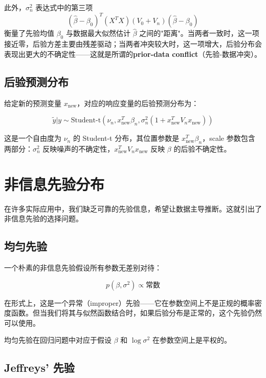 此外，$\sigma_n^2$ 表达式中的第三项
\[
(\hat{\beta} - \beta_0)^T(X^TX)(V_0 + V_n)(\hat{\beta} - \beta_0)
\]
衡量了先验均值 $\beta_0$ 与数据最大似然估计 $\hat{\beta}$ 之间的"距离"。当两者一致时，这一项接近零，后验方差主要由残差驱动；当两者冲突较大时，这一项增大，后验分布会表现出更大的不确定性——这就是所谓的\textbf{prior-data conflict}（先验-数据冲突）。

\subsection{后验预测分布}

给定新的预测变量 $x_{\text{new}}$，对应的响应变量的后验预测分布为：

\begin{equation}
\tilde{y} | y \sim \text{Student-t}(\nu_n, x_{\text{new}}^T\beta_n, \sigma_n^2(1 + x_{\text{new}}^TV_nx_{\text{new}}))
\label{eq:posterior-predictive-regression}
\end{equation}

这是一个自由度为 $\nu_n$ 的 Student-t 分布，其位置参数是 $x_{\text{new}}^T\beta_n$，scale 参数包含两部分：$\sigma_n^2$ 反映噪声的不确定性，$x_{\text{new}}^TV_nx_{\text{new}}$ 反映 $\beta$ 的后验不确定性。

\section{非信息先验分布}

在许多实际应用中，我们缺乏可靠的先验信息，希望让数据主导推断。这就引出了非信息先验的选择问题。

\subsection{均匀先验}

一个朴素的非信息先验假设所有参数无差别对待：

\begin{equation}
p(\beta, \sigma^2) \propto \text{常数}
\label{eq:uniform-prior}
\end{equation}

在形式上，这是一个异常（improper）先验——它在参数空间上不是正规的概率密度函数。但当我们将其与似然函数结合时，如果后验分布是正常的，这个先验仍然可以使用。

均匀先验在回归问题中对应于假设 $\beta$ 和 $\log\sigma^2$ 在参数空间上是平权的。

\subsection{Jeffreys' 先验}

